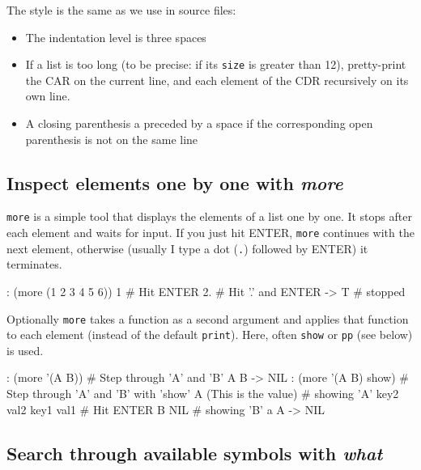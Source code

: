 The style is the same as we use in source files:

\begin{itemize}
\item The indentation level is three spaces
\item If a list is too long (to be precise: if its \texttt{size} is greater than
   12), pretty-print the CAR on the current line, and each element of
   the CDR recursively on its own line.
\item A closing parenthesis a preceded by a space if the corresponding open
   parenthesis is not on the same line
\end{itemize}

 
\subsection{Inspect elements one by one with \emph{more}}
\label{sec:tut-inspect-elements-one-by-one-with-more}


\texttt{more} is a simple tool that displays the elements of a list one by one.
It stops after each element and waits for input. If you just hit ENTER,
\texttt{more} continues with the next element, otherwise (usually I type a dot
(\texttt{.}) followed by ENTER) it terminates.


\begin{wideverbatim}
: (more (1 2 3 4 5 6))
1                          # Hit ENTER
2.                         # Hit '.' and ENTER
-> T                       # stopped
\end{wideverbatim}

Optionally \texttt{more} takes a function as a second argument and applies that
function to each element (instead of the default \texttt{print}). Here, often
\texttt{show} or \texttt{pp} (see below) is used.


\begin{wideverbatim}
: (more '(A B))            # Step through 'A' and 'B'
A
B
-> NIL
: (more '(A B) show)       # Step through 'A' and 'B' with 'show'
A (This is the value)      # showing 'A'
   key2 val2
   key1 val1
                           # Hit ENTER
B NIL                      # showing 'B'
   a A
-> NIL
\end{wideverbatim}

 
\subsection{Search through available symbols with \emph{what}}
\label{sec:tut-search-through-available-symbols-with-what}


